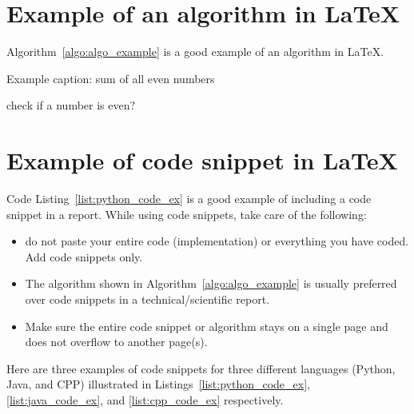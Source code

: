 \clearpage %

\section{Example of an algorithm in \LaTeX}
Algorithm~\ref{algo:algo_example} is a good example of an algorithm in \LaTeX.  
\begin{algorithm}
    \caption{Example caption: sum of all even numbers}
    \label{algo:algo_example}
    \begin{algorithmic}[1]
        \Statex
          \Comment check if a number is even?
        \EndIf
        \EndFor
        \State {}
        \EndFunction
    \end{algorithmic}
\end{algorithm}
 
\section{Example of code snippet  in \LaTeX}

Code Listing~\ref{list:python_code_ex} is a good example of including a code snippet in a report. While using code snippets, take care of the following:
\begin{itemize}
    \item do not paste your entire code (implementation) or everything you have coded. Add code snippets only. 
    \item The algorithm shown in Algorithm~\ref{algo:algo_example} is usually preferred over code snippets in a technical/scientific report. 
    \item Make sure the entire code snippet or algorithm stays on a single page and does not overflow to another page(s).  
\end{itemize}

Here are three examples of code snippets for three different languages (Python, Java, and CPP) illustrated in Listings~\ref{list:python_code_ex}, \ref{list:java_code_ex}, and \ref{list:cpp_code_ex} respectively.  

